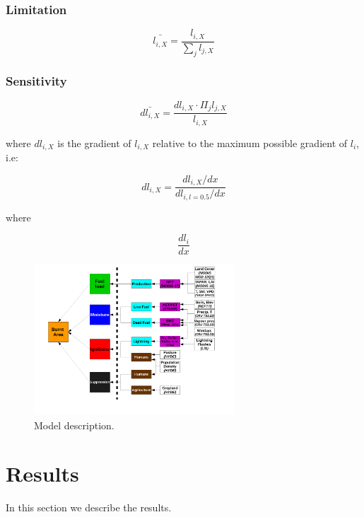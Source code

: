 \documentclass[12pt]{article}
\begin{document}
\subsubsection{Limitation}

\begin{equation}
    \bar{l_{i, X}} = \frac{l_{i, X}}{\sum_{j} l_{j, X}}
\end{equation}

\subsubsection{Sensitivity}

\begin{equation}
    \bar{dl_{i, X}} = \frac{dl_{i, X} \cdot \Pi_{j} l_{j, X}}{l_{i, X}}
\end{equation}

where $dl_{i, X}$ is the gradient of $l_{i, X}$ relative to the maximum possible gradient of $l_{i}$, i.e:

\begin{equation}
    dl_{i, X} = \frac{dl_{i, X} / dx}{dl_{i, l = 0.5} / dx}
\end{equation}

where

\begin{equation}
    \frac{dl_{i}}{dx}
\end{equation}

\begin{figure}[!ht]
  \centering
    \includegraphics[width=0.67\textwidth]{Model_schematic.pdf}
  \caption{Model description.}
\end{figure}



\section{Results}\label{results}
In this section we describe the results.
\end{document}
